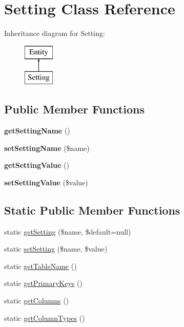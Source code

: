 \hypertarget{classSetting}{
\section{Setting Class Reference}
\label{classSetting}
}
Inheritance diagram for Setting:\begin{figure}[H]
\begin{center}
\leavevmode
\includegraphics[height=2.000000cm]{classSetting}
\end{center}
\end{figure}
\subsection*{Public Member Functions}
\begin{DoxyCompactItemize}
\item 
\hypertarget{classSetting_afc1e17b405d06caab9faf3362d3522b4}{
{\bfseries getSettingName} ()}
\label{classSetting_afc1e17b405d06caab9faf3362d3522b4}

\item 
\hypertarget{classSetting_a1a69278c2aac36ffee09cc16324ddf39}{
{\bfseries setSettingName} (\$name)}
\label{classSetting_a1a69278c2aac36ffee09cc16324ddf39}

\item 
\hypertarget{classSetting_aa98eb86325da3d3e4c98f007eda9c7ae}{
{\bfseries getSettingValue} ()}
\label{classSetting_aa98eb86325da3d3e4c98f007eda9c7ae}

\item 
\hypertarget{classSetting_a8714591d5d8722109dffff3edf449fee}{
{\bfseries setSettingValue} (\$value)}
\label{classSetting_a8714591d5d8722109dffff3edf449fee}

\end{DoxyCompactItemize}
\subsection*{Static Public Member Functions}
\begin{DoxyCompactItemize}
\item 
static \hyperlink{classSetting_a2ad01978f63a0087e552f9fb2de7e109}{getSetting} (\$name, \$default=null)
\item 
static \hyperlink{classSetting_adbcf1f8af6c1832b0ad59d39b550a6d0}{setSetting} (\$name, \$value)
\item 
static \hyperlink{classSetting_ada9934fb4f6bddcf5250494b63d81c5e}{getTableName} ()
\item 
static \hyperlink{classSetting_a20ab54f018e4987326d20a5464c7e615}{getPrimaryKeys} ()
\item 
static \hyperlink{classSetting_ac1dc23d6b6f1fbd01ac0fd51e05cab3a}{getColumns} ()
\item 
static \hyperlink{classSetting_afde410fc459b142b11a50511414dc57d}{getColumnTypes} ()
\end{DoxyCompactItemize}
